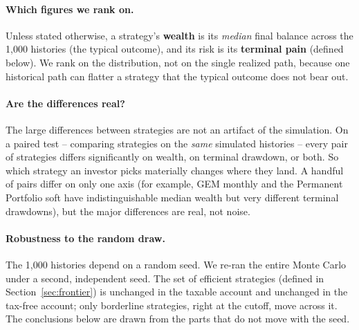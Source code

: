 \documentclass[11pt]{article}
\begin{document}
\paragraph{Which figures we rank on.} Unless stated otherwise, a strategy's \textbf{wealth} is its
\emph{median} final balance across the 1{,}000 histories (the typical outcome), and its risk is its
\textbf{terminal pain} (defined below). We rank on the distribution, not on the single realized path,
because one historical path can flatter a strategy that the typical outcome does not bear out.

\paragraph{Are the differences real?} The large differences between strategies are not an artifact of
the simulation. On a paired test -- comparing strategies on the \emph{same} simulated histories -- every
pair of strategies differs significantly on wealth, on terminal drawdown, or both. So which strategy an
investor picks materially changes where they land. A handful of pairs differ on only one axis (for
example, GEM monthly and the Permanent Portfolio soft have indistinguishable median wealth but very
different terminal drawdowns), but the major differences are real, not noise.

\paragraph{Robustness to the random draw.} The 1{,}000 histories depend on a random seed. We re-ran the
entire Monte Carlo under a second, independent seed. The set of efficient strategies (defined in
Section~\ref{sec:frontier}) is unchanged in the taxable account and unchanged in the tax-free account;
only borderline strategies, right at the cutoff, move across it. The conclusions below are drawn
from the parts that do not move with the seed.
\end{document}
